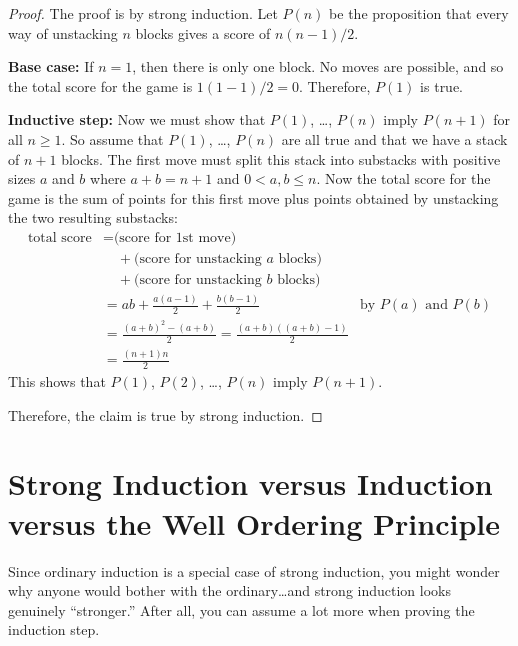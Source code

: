 \begin{proof}
The proof is by strong induction.  Let $P(n)$ be the proposition that
every way of unstacking $n$ blocks gives a score of $n(n-1)/2$.

\textbf{Base case:} If $n = 1$, then there is only one
block.  No moves are possible, and so the total score for the game is
$1(1 - 1)/2 = 0$.  Therefore, $P(1)$ is true.

\textbf{Inductive step:} Now we must show that $P(1)$, \dots, $P(n)$ imply
$P(n+1)$ for all $n \geq 1$.  So assume that $P(1)$, \dots, $P(n)$ are all
true and that we have a stack of $n+1$ blocks.  The first move must split
this stack into substacks with positive sizes $a$ and $b$ where $a+b =
n+1$ and $0<a,b\leq n$.  Now the total score for the game is the sum of
points for this first move plus points obtained by unstacking the two
resulting substacks:
%
\begin{align*}
\text{total score}
    & = \text{(score for 1st move)} \\
    & \quad + \text{(score for unstacking $a$ blocks)} \\
    & \quad + \text{(score for unstacking $b$ blocks)} \\
    & = ab + \frac{a(a-1)}{2} + \frac{b(b-1)}{2} & \text{by $P(a)$ and $P(b)$}\\
    & = \frac{(a+b)^2-(a+b)}{2} = \frac{(a+b)((a+b)-1)}{2}\\
    & = \frac{(n+1)n}{2}
\end{align*}
%
This shows that $P(1)$, $P(2)$, \dots, $P(n)$ imply $P(n+1)$.

Therefore, the claim is true by strong induction.
\end{proof}
\fi

\begin{problems}
\classproblems
{}
\homeworkproblems
{}
\end{problems}

\section{Strong Induction versus Induction versus the Well Ordering Principle}
\label{versusWO}

Since ordinary induction is a special case of strong induction, you
might wonder why anyone would bother with the ordinary\dots and strong
induction looks genuinely ``stronger.''  After all, you can assume a
lot more when proving the induction step.

